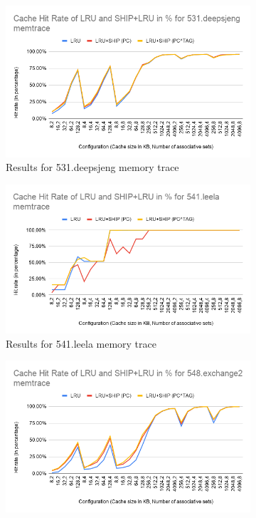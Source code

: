 \documentclass[letterpaper, 11pt]{article}
\begin{document}
	\begin{figure}[htb!]
		\centering
		\begin{subfigure}[b]{.6\linewidth}
			\includegraphics[width=\textwidth]{cache_hr_531_deepsjeng_memtrace.png}
			\caption{Results for 531.deepsjeng memory trace}
			\label{fig2a}
		\end{subfigure}
		\begin{subfigure}[b]{.6\linewidth}
			\includegraphics[width=\textwidth]{cache_hr_541_leela_memtrace.png}
			\caption{Results for 541.leela memory trace}
			\label{fig2b}
		\end{subfigure}
		\begin{subfigure}[b]{.6\linewidth}
			\includegraphics[width=\textwidth]{cache_hr_548_exchange2_memtrace.png}

\end{subfigure}
\end{figure}
\end{document}
